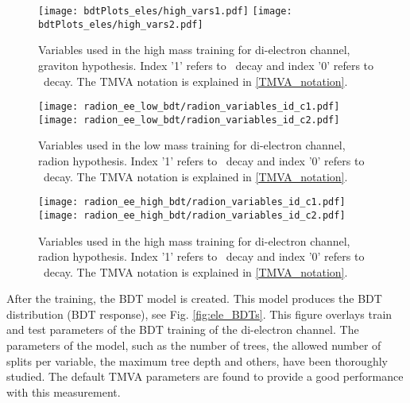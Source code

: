 \begin{figure}[H]
\begin{center}
\texttt{[image: bdtPlots\_eles/high\_vars1.pdf]}
\texttt{[image: bdtPlots\_eles/high\_vars2.pdf]}
\caption[Variables used in the high mass training for di-electron channel, graviton hypothesis.]{ Variables used in the high mass training for di-electron channel, graviton hypothesis. Index '1' refers to \HBB~decay and index '0' refers to \HZZ~decay. The TMVA notation is explained in \ref{TMVA_notation}.}
\label{fig:ele_highVars}
\end{center}
\end{figure}

\begin{figure}[H]
\begin{center}
\texttt{[image: radion\_ee\_low\_bdt/radion\_variables\_id\_c1.pdf]}
\texttt{[image: radion\_ee\_low\_bdt/radion\_variables\_id\_c2.pdf]}
\caption[Variables used in the low mass training for di-electron channel, radion hypothesis.]{ Variables used in the low mass training for di-electron channel, radion hypothesis. Index '1' refers to \HBB~decay and index '0' refers to \HZZ~decay. The TMVA notation is explained in \ref{TMVA_notation}.}
\label{fig:ele_lowVars_radion}
\end{center}
\end{figure}

\begin{figure}[H]
\begin{center}
\texttt{[image: radion\_ee\_high\_bdt/radion\_variables\_id\_c1.pdf]}
\texttt{[image: radion\_ee\_high\_bdt/radion\_variables\_id\_c2.pdf]}
\caption[Variables used in the high mass training for di-electron channel, radion hypothesis.]{ Variables used in the high mass training for di-electron channel, radion hypothesis. Index '1' refers to \HBB~decay and index '0' refers to \HZZ~decay. The TMVA notation is explained in \ref{TMVA_notation}.}
\label{fig:ele_highVars_radion}
\end{center}
\end{figure}



After the training, the BDT model is created. This model produces the BDT distribution (BDT response), see Fig. \ref{fig:ele_BDTs}. This figure overlays train and test parameters of the BDT training of the di-electron channel. The parameters of the model, such as the number of trees, the allowed number of splits per variable, the maximum tree depth and others, have been thoroughly studied. The default TMVA parameters are found to provide a good performance with this measurement. 

